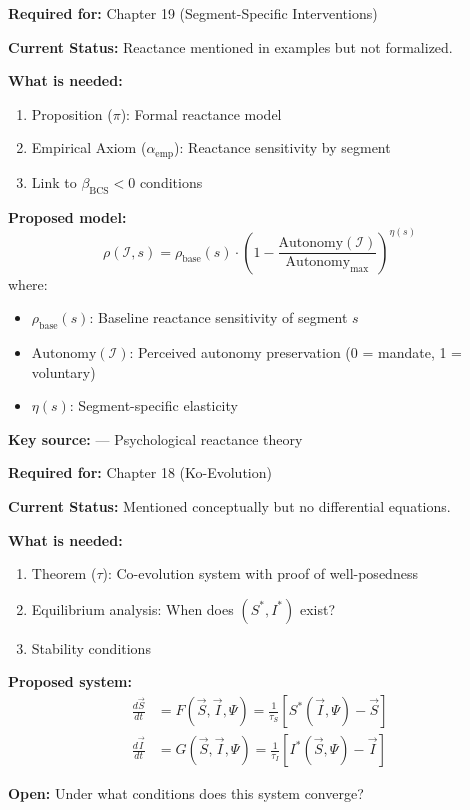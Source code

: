 \begin{tcolorbox}[colback=green!5!white, colframe=green!75!black,
    title=\textbf{TODO-IE-7: Reactance Model $\rho(\mathcal{I}, s)$}]

\textbf{Required for:} Chapter 19 (Segment-Specific Interventions)

\textbf{Current Status:} Reactance mentioned in examples but not formalized.

\textbf{What is needed:}
\begin{enumerate}[nosep]
    \item Proposition ($\pi$): Formal reactance model
    \item Empirical Axiom ($\alpha_{\text{emp}}$): Reactance sensitivity by segment
    \item Link to $\beta_{\text{BCS}} < 0$ conditions
\end{enumerate}

\textbf{Proposed model:}
\[
\rho(\mathcal{I}, s) = \rho_{\text{base}}(s) \cdot \left(1 - \frac{\text{Autonomy}(\mathcal{I})}{\text{Autonomy}_{\max}}\right)^{\eta(s)}
\]
where:
\begin{itemize}[nosep]
    \item $\rho_{\text{base}}(s)$: Baseline reactance sensitivity of segment $s$
    \item $\text{Autonomy}(\mathcal{I})$: Perceived autonomy preservation (0 = mandate, 1 = voluntary)
    \item $\eta(s)$: Segment-specific elasticity
\end{itemize}

\textbf{Key source:} \citet{brehm1966theory} --- Psychological reactance theory

\end{tcolorbox}

\begin{tcolorbox}[colback=green!5!white, colframe=green!75!black,
    title=\textbf{TODO-IE-8: Co-Evolution Dynamics $\frac{d\vec{S}}{dt}, \frac{d\vec{I}}{dt}$}]

\textbf{Required for:} Chapter 18 (Ko-Evolution)

\textbf{Current Status:} Mentioned conceptually but no differential equations.

\textbf{What is needed:}
\begin{enumerate}[nosep]
    \item Theorem ($\tau$): Co-evolution system with proof of well-posedness
    \item Equilibrium analysis: When does $(S^*, I^*)$ exist?
    \item Stability conditions
\end{enumerate}

\textbf{Proposed system:}
\begin{align}
\frac{d\vec{S}}{dt} &= F(\vec{S}, \vec{I}, \Psi) = \frac{1}{\tau_S}[S^*(\vec{I}, \Psi) - \vec{S}] \\
\frac{d\vec{I}}{dt} &= G(\vec{S}, \vec{I}, \Psi) = \frac{1}{\tau_I}[I^*(\vec{S}, \Psi) - \vec{I}]
\end{align}

\textbf{Open:} Under what conditions does this system converge?

\end{tcolorbox}

